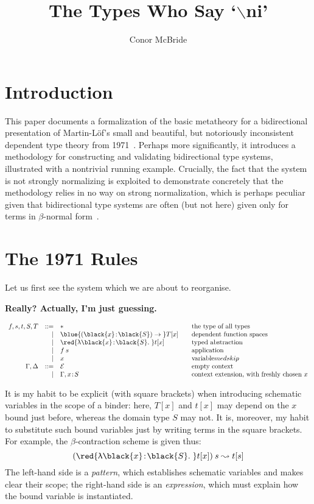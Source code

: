 \documentclass[natbib]{article}
\newcommand{\type}{\ast}
\newcommand{\hb}{\!:\!}
\newcommand{\PI}[2]{\blue{(\black{#1}\hb \black{#2})\to\;}}
\newcommand{\LT}[2]{\red{\uplambda\black{#1}\hb \black{#2}.\;}}
\newcommand{\EC}{\mathcal{E}}
\begin{document}
\title{The Types Who Say `$\backslash$ni'}
\author{Conor McBride}
\maketitle

\section{Introduction}

This paper documents a formalization of the basic metatheory for a bidirectional presentation of Martin-L\"of's small and beautiful, but notoriously inconsistent dependent type theory from 1971~\cite{martinloef:atheoryoftypes}. Perhaps more significantly, it introduces a methodology for constructing and validating bidirectional type systems, illustrated with a nontrivial running example. Crucially, the fact that the system is not strongly normalizing is exploited to demonstrate concretely that the methodology relies in no way on strong normalization, which is perhaps peculiar given that bidirectional type systems are often (but not here) given only for terms in $\beta$-normal form~\cite{DBLP:journals/toplas/PierceT00}.


\section{The 1971 Rules}

Let us first see the system which we are about to reorganise.

\textbf{Really? Actually, I'm just guessing.}

\[\begin{array}{rrl@{\qquad}l}
f,s,t,S,T & ::= & \type & \mbox{the type of all types} \\
          &   | & \PI xS T[x] & \mbox{dependent function spaces} \\
          &   | & \LT xS t[x] & \mbox{typed abstraction} \\
          &   | & f\:s        & \mbox{application} \\
          &   | & x           & \mbox{variable} medskip\\
\Gamma,\Delta & ::= & \EC & \mbox{empty context} \\
              &   | & \Gamma,x\hb S & \mbox{context extension, with freshly chosen $x$}
\end{array}\]

It is my habit to be explicit (with square brackets) when introducing schematic variables in the scope of a binder: here, $T[x]$ and $t[x]$ may depend on the $x$ bound just before, whereas the domain type $S$ may not. It is, moreover, my habit to substitute such bound variables just by writing terms in the square brackets. For example, the $\beta$-contraction scheme is given thus:
\[
(\LT xS t[x])\:s \leadsto t[s]
\]
The left-hand side is a \emph{pattern}, which establishes schematic variables and makes clear their scope;
the right-hand side is an \emph{expression}, which must explain how the bound variable is instantiated.
\end{document}
